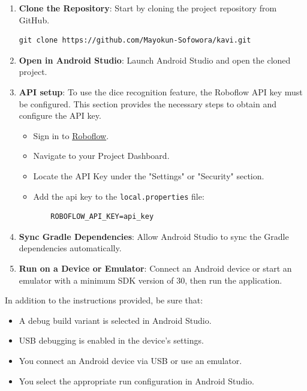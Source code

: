 \begin{enumerate}
    \item \textbf{Clone the Repository}: Start by cloning the project repository from GitHub.
    \begin{verbatim}
git clone https://github.com/Mayokun-Sofowora/kavi.git
    \end{verbatim}

    \item \textbf{Open in Android Studio}: Launch Android Studio and open the cloned project.

    \item  \textbf{API setup}: To use the dice recognition feature, the Roboflow API key must be configured. This section provides the necessary steps to obtain and configure the API key.
    \begin{itemize}
        \item Sign in to \href{https://roboflow.com/}{Roboflow}.
        \item Navigate to your Project Dashboard.
        \item Locate the API Key under the "Settings" or "Security" section.
        \item Add the api key to the \texttt{local.properties} file:
        \begin{verbatim}
    ROBOFLOW_API_KEY=api_key
        \end{verbatim}
    \end{itemize}

    \item \textbf{Sync Gradle Dependencies}: Allow Android Studio to sync the Gradle dependencies automatically.

    \item \textbf{Run on a Device or Emulator}: Connect an Android device or start an emulator with a minimum SDK version of 30, then run the application.
\end{enumerate}


In addition to the instructions provided, be sure that:
\begin{itemize}
    \item  A debug build variant is selected in Android Studio.
    \item USB debugging is enabled in the device's settings.
    \item You connect an Android device via USB or use an emulator.
    \item  You select the appropriate run configuration in Android Studio.
\end{itemize}

